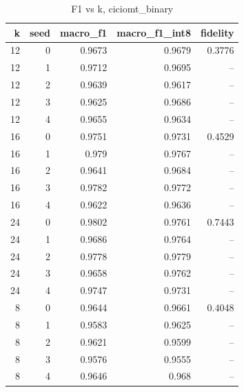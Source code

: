 \begin{table}
\caption{F1 vs k, ciciomt_binary}
\begin{tabular}{rrrrr}
\toprule
k & seed & macro_f1 & macro_f1_int8 & fidelity \\
\midrule
12 & 0 & 0.9673 & 0.9679 & 0.3776 \\
12 & 1 & 0.9712 & 0.9695 & -- \\
12 & 2 & 0.9639 & 0.9617 & -- \\
12 & 3 & 0.9625 & 0.9686 & -- \\
12 & 4 & 0.9655 & 0.9634 & -- \\
16 & 0 & 0.9751 & 0.9731 & 0.4529 \\
16 & 1 & 0.979 & 0.9767 & -- \\
16 & 2 & 0.9641 & 0.9684 & -- \\
16 & 3 & 0.9782 & 0.9772 & -- \\
16 & 4 & 0.9622 & 0.9636 & -- \\
24 & 0 & 0.9802 & 0.9761 & 0.7443 \\
24 & 1 & 0.9686 & 0.9764 & -- \\
24 & 2 & 0.9778 & 0.9779 & -- \\
24 & 3 & 0.9658 & 0.9762 & -- \\
24 & 4 & 0.9747 & 0.9731 & -- \\
8 & 0 & 0.9644 & 0.9661 & 0.4048 \\
8 & 1 & 0.9583 & 0.9625 & -- \\
8 & 2 & 0.9621 & 0.9599 & -- \\
8 & 3 & 0.9576 & 0.9555 & -- \\
8 & 4 & 0.9646 & 0.968 & -- \\
\bottomrule
\end{tabular}
\end{table}
